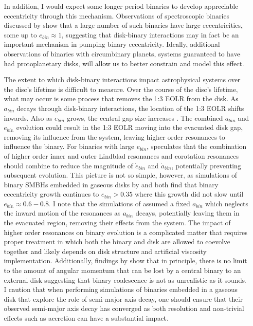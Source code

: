 In addition, I would expect some longer period binaries to develop appreciable eccentricity through this mechanism.  Observations of spectroscopic binaries discussed by \citet{Mazeh2008} show that a large number of such binaries have large eccentricities, some up to $e_{bin} \approx 1$, suggesting that disk-binary interactions may in fact be an important mechanism in pumping binary eccentricity.  Ideally, additional observations of binaries with circumbinary planets, systems guaranteed to have had protoplanetary disks, will allow us to better constrain and model this effect.

The extent to which disk-binary interactions impact astrophysical systems over the disc's lifetime is difficult to measure.  Over the course of the disc's 
lifetime, what may occur is some process that removes the 1:3 EOLR from the disk.  As $a_{bin}$ decays through disk-binary interactions, the location of the 
1:3 EOLR shifts inwards.  Also as $e_{bin}$ grows, the central gap size increases \citep{Artymowicz1994}.  The combined $a_{bin}$ and $e_{bin}$ evolution could result 
in the 1:3 EOLR moving into the evacuated disk gap, removing its influence from the system, leaving higher order resonances to influence the binary.  For 
binaries with large $e_{bin}$, \citet{Artymowicz1991} speculates that the combination of higher order inner and outer Lindblad resonances and corotation resonances 
should combine to reduce the magnitude of $\dot{e}_{bin}$ and $\dot{a}_{bin}$, potentially preventing subsequent evolution.  This picture is not so 
simple, however, as simulations of binary SMBHs embedded in gaseous disks by \citet{Cuadra2009} and \citet{Roedig2011} both find that binary eccentricity growth 
continues to $e_{bin} > 0.35$ where this growth did not slow until $e_{bin} \approx 0.6-0.8$.  I note that the simulations of \citet{Roedig2011} assumed a fixed 
$a_{bin}$ which neglects the inward motion of the resonances as $a_{bin}$ decays, potentially leaving them in the evacuated region, removing their effects 
from the system.  The impact of higher order resonances on binary evolution is a complicated matter that requires proper treatment in which both the binary and 
disk are allowed to coevolve together and likely depends on disk structure and artificial viscosity implementation.  Additionally, findings by \citet{Pringle1991} show 
that in principle, there is no limit to the amount of angular momentum that can be lost by a central binary to an external disk suggesting that binary coalescence 
is not as unrealistic as it sounds.   I caution that when performing simulations of binaries embedded in a gaseous disk that explore the role of semi-major axis decay, one should ensure that their observed semi-major axis decay has converged as both resolution and non-trivial effects such as accretion \citep[e.g.][]{Roedig2012} can have a substantial impact.

